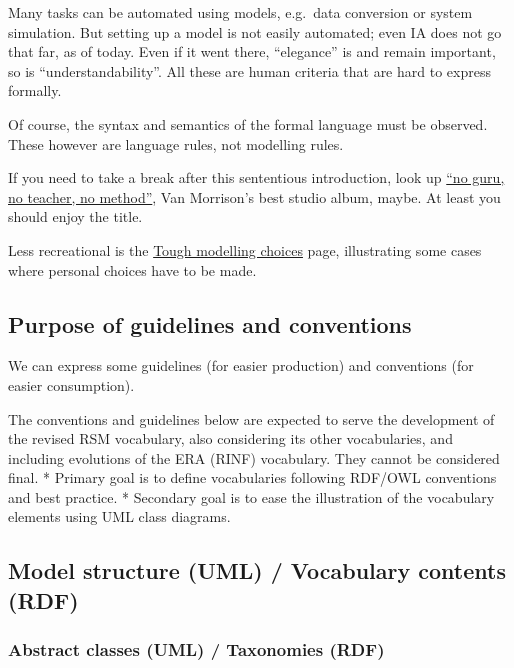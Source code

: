 \documentclass[
  11pt,
]{article}
\begin{document}
Many tasks can be automated using models, e.g.~data conversion or system
simulation. But setting up a model is not easily automated; even IA does
not go that far, as of today. Even if it went there, ``elegance'' is and
remain important, so is ``understandability''. All these are human
criteria that are hard to express formally.

Of course, the syntax and semantics of the formal language must be
observed. These however are language rules, not modelling rules.

If you need to take a break after this sententious introduction, look up
\href{https://www.youtube.com/watch?v=E8Cnh7uD0b4}{``no guru, no
teacher, no method''}, Van Morrison's best studio album, maybe. At least
you should enjoy the title.

Less recreational is the \protect\hyperlink{modelling-choices}{Tough
modelling choices} page, illustrating some cases where personal choices
have to be made.

\hypertarget{purpose-of-guidelines-and-conventions}{%
\subsection{Purpose of guidelines and
conventions}\label{purpose-of-guidelines-and-conventions}}

We can express some guidelines (for easier production) and conventions
(for easier consumption).

The conventions and guidelines below are expected to serve the
development of the revised RSM vocabulary, also considering its other
vocabularies, and including evolutions of the ERA (RINF) vocabulary.
They cannot be considered final. * Primary goal is to define
vocabularies following RDF/OWL conventions and best practice. *
Secondary goal is to ease the illustration of the vocabulary elements
using UML class diagrams.

\hypertarget{model-structure-uml-vocabulary-contents-rdf}{%
\subsection{Model structure (UML) / Vocabulary contents
(RDF)}\label{model-structure-uml-vocabulary-contents-rdf}}

\hypertarget{abstract-classes-uml-taxonomies-rdf}{%
\subsubsection{Abstract classes (UML) / Taxonomies
(RDF)}\label{abstract-classes-uml-taxonomies-rdf}}
\end{document}
